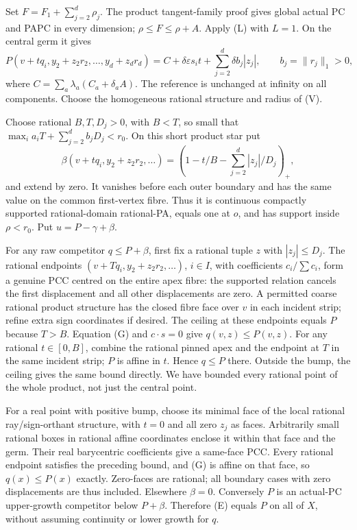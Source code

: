 \documentclass[
  11pt,
]{article}
\begin{document}
Set \(F=F_1+\sum_{j=2}^d\rho_j\). The product tangent-family proof gives
global actual PC and PAPC in every dimension; \(\rho\leq F\leq\rho+A\).
Apply (L) with \(L=1\). On the central germ it gives \[
 P(v+tq_i,y_2+z_2r_2,\ldots,y_d+z_dr_d)
       =C+\delta\varepsilon s_it+\sum_{j=2}^d\delta b_j|z_j|,
       \qquad b_j=\|r_j\|_1>0,
 \tag{G}
\] where \(C=\sum_a\lambda_a(C_a+\delta_a A)\). The reference is
unchanged at infinity on all components. Choose the homogeneous rational
structure and radius of (V).

Choose rational \(B,T,D_j>0\), with \(B<T\), so small that
\(\max_i a_iT+\sum_{j=2}^d b_jD_j<r_0\). On this short product star put
\[
 \beta(v+tq_i,y_2+z_2r_2,\ldots)=
            (1-t/B-\sum_{j=2}^d|z_j|/D_j)_+,
 \tag{B}
\] and extend by zero. It vanishes before each outer boundary and has
the same value on the common first-vertex fibre. Thus it is continuous
compactly supported rational-domain rational-PA, equals one at \(o\),
and has support inside \(\rho<r_0\). Put \(u=P-\gamma+\beta\).

For any raw competitor \(q\leq P+\beta\), first fix a rational tuple
\(z\) with \(|z_j|\leq D_j\). The rational endpoints
\((v+Tq_i,y_2+z_2r_2,\ldots)\), \(i\in I\), with coefficients
\(c_i/\sum c_i\), form a genuine PCC centred on the entire apex fibre:
the supported relation cancels the first displacement and all other
displacements are zero. A permitted coarse rational product structure
has the closed fibre face over \(v\) in each incident strip; refine
extra sign coordinates if desired. The ceiling at these endpoints equals
\(P\) because \(T>B\). Equation (G) and \(c\cdot s=0\) give
\(q(v,z)\leq P(v,z)\). For any rational \(t\in[0,B]\), combine the
rational pinned apex and the endpoint at \(T\) in the same incident
strip; \(P\) is affine in \(t\). Hence \(q\leq P\) there. Outside the
bump, the ceiling gives the same bound directly. We have bounded every
rational point of the whole product, not just the central point.

For a real point with positive bump, choose its minimal face of the
local rational ray/sign-orthant structure, with \(t=0\) and all zero
\(z_j\) as faces. Arbitrarily small rational boxes in rational affine
coordinates enclose it within that face and the germ. Their real
barycentric coefficients give a same-face PCC. Every rational endpoint
satisfies the preceding bound, and (G) is affine on that face, so
\(q(x)\leq P(x)\) exactly. Zero-faces are rational; all boundary cases
with zero displacements are thus included. Elsewhere \(\beta=0\).
Conversely \(P\) is an actual-PC upper-growth competitor below
\(P+\beta\). Therefore (E) equals \(P\) on all of \(X\), without
assuming continuity or lower growth for \(q\).
\end{document}
